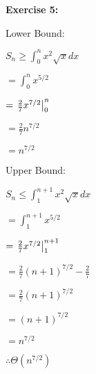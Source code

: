 \documentclass[12pt,letterpaper,final]{report}
\begin{document}
\bigskip


\noindent\textbf{Exercise 5:}

Lower Bound:

$S_n \ge \int_{0}^{n} x^2\sqrt{x} dx$

$= \int_{0}^{n} x^{5/2}$

$=\eval{\frac{2}{7}x^{7/2}}_0^n $

$= \frac{2}{7}n^{7/2}$

$=n^{7/2}$


\bigskip
Upper Bound:

$S_n \le \int_{1}^{n+1} x^2\sqrt{x} dx$

$= \int_{1}^{n+1} x^{5/2}$

$=\eval{\frac{2}{7}x^{7/2}}_1^{n+1}$

$= \frac{2}{7}(n+1)^{7/2}-\frac{2}{7}$

$= \frac{2}{7}(n+1)^{7/2}$

$= (n+1)^{7/2}$

$=n^{7/2}$
\bigskip

$\therefore \Theta(n^{7/2})$
\bigskip









\end{document}

